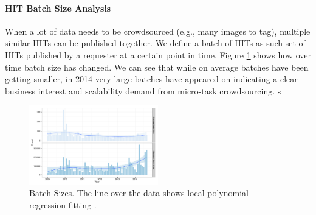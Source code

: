 \paragraph{HIT Batch Size Analysis}
When a lot of data needs to be crowdsourced (e.g., many images to tag), multiple similar HITs can be published together. We define a batch of HITs as such set of HITs published by a requester at a certain point in time. Figure \ref{fig:batch_size} shows how over time batch size has changed.
We can see that while on average batches have been getting smaller, in 2014 very large batches have appeared on \amt{} indicating a clear business interest and scalability demand from micro-task crowdsourcing.
s
\begin{figure}[htbp]
	\centering
		\includegraphics[width=0.5\textwidth]{figures/batch_size}
	\caption{Batch Sizes. The line over the data shows local polynomial regression fitting \cite{cleveland1992local}.}
	\label{fig:batch_size}
\end{figure}


